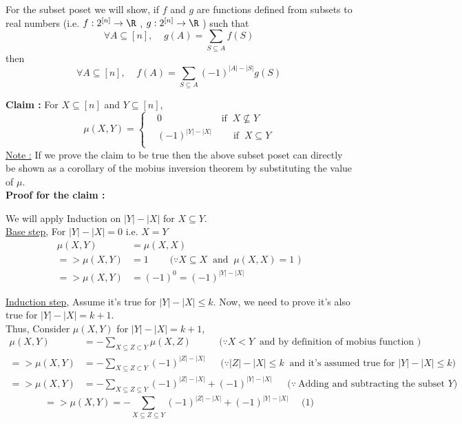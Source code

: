 \noindent For the subset poset we will show, if $f$ and $g$ are functions defined from subsets to real numbers (i.e. 
$f: 2^{[n]} \rightarrow \R$ , $g: 2^{[n]} \rightarrow \R $ ) such that
$$\forall A \subseteq [n], ~~~~~ g(A) = \sum_{S \subseteq A} f(S) $$
then
$$\boxed{\forall A \subseteq [n], ~~~~~ f(A) = \sum_{S \subseteq A} (-1)^{|A|- |S|}g(S) } $$

\noindent \textbf{Claim :} For $X \subseteq [n]$ and $Y \subseteq [n]$,
$$ \mu (X,Y) = 
\begin{cases}
    &0 ~~~~~~~~~~~~~~~~~~~~~~~~~~~~\textrm{if $~X \nsubseteq Y$}\\
    &(-1)^{|Y| - |X|} ~~~~~~~~~~\textrm{if $~X \subseteq Y$}\\
\end{cases}
$$
\underline{\textsf{Note :}} If we prove the claim to be true then the above subset poset can directly be shown as a corollary of the mobius inversion theorem by substituting the value of $\mu$.\\

\noindent \textbf{Proof for the claim :} 

\noindent We will apply Induction on $|Y|-|X|$ for $X \subseteq Y$.\\

\noindent \underline{Base step}, For $|Y| - |X| = 0$ i.e. $X = Y$
\begin{align*}
    \mu (X,Y) &= \mu(X,X)\\
    => \mu (X,Y) &= 1  ~~~~~~~~~~\textrm{($\because X \subseteq X ~$ and $~\mu (X,X) = 1$ )}\\
    => \mu (X,Y) &= (-1)^{0} = (-1)^{|Y| - |X|}
\end{align*}

\noindent \underline{Induction step}, Assume it's true for $|Y| - |X| \le k$. Now, we need to prove it's also true for $|Y| - |X| = k + 1$.\\

\noindent Thus, Consider $\mu (X,Y)$ for $|Y| - |X| = k + 1$,
\begin{align*}
    \mu (X,Y) &= - \sum_{X \subseteq Z \subset Y} \mu (X,Z) ~~~~~~~~~~~~~\textrm{($\because X < Y~$ and by definition of mobius function )}\\
 => \mu (X,Y) &= - \sum_{X \subseteq Z \subset Y} (-1)^{|Z|-|X|} ~~~~~~~\textrm{($\because |Z| - |X| \le k~$ and it's assumed true for $|Y| - |X| \le k$)}\\
 => \mu (X,Y) &= - \sum_{X \subseteq Z \subseteq Y} (-1)^{|Z|-|X|} + (-1)^{|Y| - |X|} ~~~~~~~\textrm{($\because~$Adding and subtracting the subset $Y$)}
\end{align*}
$$=> \boxed{\mu (X,Y) = - \sum_{X \subseteq Z \subseteq Y} (-1)^{|Z|-|X|} + (-1)^{|Y| - |X|}} ~~~~~~\textrm{(1)}$$

